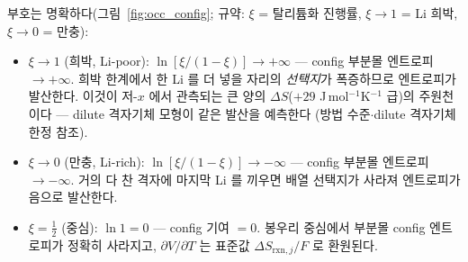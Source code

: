 \documentclass[11pt,a4paper]{article}
\newcommand{\rxn}{\mathrm{rxn}}
\begin{document}
부호는 명확하다(그림~\ref{fig:occ_config}; 규약: $\xi$ = 탈리튬화 진행률, $\xi\to1$ = Li 희박, $\xi\to0$ = 만충):
\begin{itemize}[leftmargin=1.4em,itemsep=1pt]
\item $\xi\to1$ (희박, Li-poor): $\ln[\xi/(1-\xi)]\to+\infty$ — config 부분몰 엔트로피 $\to+\infty$. 희박
한계에서 한 Li 를 더 넣을 자리의 \emph{선택지}가 폭증하므로 엔트로피가 발산한다. 이것이 저-$x$ 에서
관측되는 큰 양의 $\Delta S$($+29$ J\,mol$^{-1}$K$^{-1}$ 급)의 주원천이다 — dilute 격자기체 모형이 같은
발산을 예측한다 \cite{occupation2019}(방법 수준$\cdot$dilute 격자기체 한정 참조).
\item $\xi\to0$ (만충, Li-rich): $\ln[\xi/(1-\xi)]\to-\infty$ — config 부분몰 엔트로피 $\to-\infty$. 거의 다 찬
격자에 마지막 Li 를 끼우면 배열 선택지가 사라져 엔트로피가 음으로 발산한다.
\item $\xi=\tfrac12$ (중심): $\ln 1=0$ — config 기여 $=0$. 봉우리 중심에서 부분몰 config 엔트로피가 정확히
사라지고, $\partial V/\partial T$ 는 표준값 $\Delta S_{\rxn,j}/F$ 로 환원된다.
\end{itemize}
\end{document}
